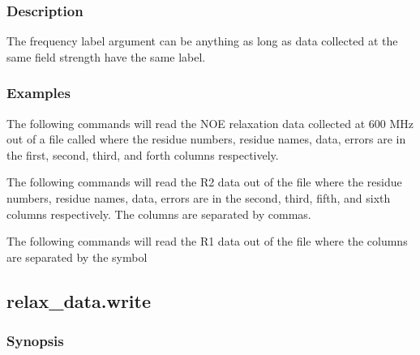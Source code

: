 \subsubsection{Description}

The frequency label argument can be anything as long as data collected at the same field
strength have the same label.


\subsubsection{Examples}

The following commands will read the NOE relaxation data collected at 600 MHz out of a file
called 
 where the residue numbers, residue names, data, errors are in the
first, second, third, and forth columns respectively.





The following commands will read the R2 data out of the file 
 where the residue
numbers, residue names, data, errors are in the second, third, fifth, and sixth columns
respectively.  The columns are separated by commas.





The following commands will read the R1 data out of the file 
 where the columns are
separated by the symbol 





\newpage

\subsection{relax\_data.write}


\subsubsection{Synopsis}

